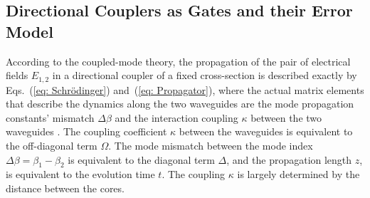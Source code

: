 \documentclass[floatfix,reprint, amsmath,amssymb,aps,superscriptaddress,nofootinbib]{revtex4-2}
\begin{document}
\subsection{Directional Couplers as Gates and their Error Model \label{sec: Error Model for correlated}}

According to the coupled-mode theory, the propagation of the pair of electrical fields $E_{1,2}$ in a directional coupler of a fixed cross-section is described exactly by  Eqs.~(\ref{eq: Schrödinger}) and~(\ref{eq: Propagator}), where the actual matrix elements that describe the dynamics along the two waveguides are the mode propagation constants' mismatch $\Delta\beta$ and the interaction coupling $\kappa$ between the two waveguides \cite{boyd2020nonlinear}. The coupling coefficient $\kappa$ between the waveguides is equivalent to the off-diagonal term $\Omega$. The mode mismatch between the mode index $\Delta\beta=\beta_1-\beta_2$ is equivalent to the diagonal term $\Delta$, and the propagation length $z$, is equivalent to the evolution time $t$.  The  coupling $\kappa$ is largely determined by the distance between the cores.
\end{document}
